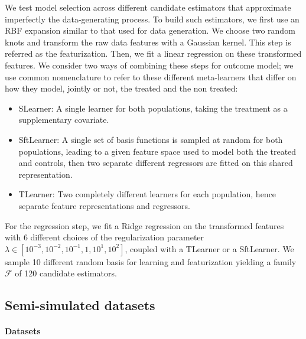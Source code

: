 \documentclass[a4paper,num-refs]{oup-contemporary}%
\begin{document}
We test model selection across different candidate estimators that
approximate imperfectly the
data-generating process. To build such estimators, we first use an RBF
expansion similar to that used for data generation. We choose two random
knots and transform the raw data features with a Gaussian
kernel. This step is referred as the featurization. Then, we fit a linear
regression on these transformed features. We consider two ways of combining
these steps for outcome model; we use common nomenclature
\cite{kunzel_metalearners_2019,shen2023rctrep} to refer to these different
meta-learners that differ on how they model, jointly or not, the treated and the
non treated:
\begin{itemize}
    \item SLearner: A single learner for both populations, taking the treatment as
          a supplementary covariate.
    \item SftLearner: A single set of basis functions is sampled at random for both
          populations, leading to a given feature space used to model both the treated and
          controls, then two
          separate different regressors are fitted on this shared representation.
    \item TLearner: Two completely different learners for each population, hence
          separate feature representations and regressors.
\end{itemize}


For the regression step, we fit a Ridge regression on the transformed features
with 6 different choices of the regularization parameter $\lambda \in [10^{-3},
        10^{-2}, 10^{-1}, 1, 10^{1}, 10^{2}]$, coupled with a TLearner or
a SftLearner.
We sample 10 different random basis for learning and
featurization yielding a family $\mathcal F$ of 120 candidate estimators.
%

\subsection{Semi-simulated datasets}

\paragraph{Datasets}\label{semi_simulated:datasets}
\end{document}
